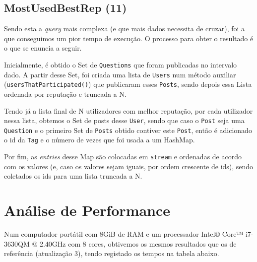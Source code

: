 \documentclass[a4paper]{article}
\begin{document}
	\subsection{MostUsedBestRep (11)}
		\tab Sendo esta a \textit{query} mais complexa (e que mais dados necessita de cruzar), foi
		a que conseguimos um pior tempo de execução. O processo para obter o resultado é o que se
		enuncia a seguir.
		\par Inicialmente, é obtido o Set de \texttt{Questions} que foram publicadas no intervalo dado.
		A partir desse Set, foi criada uma lista de \texttt{Users} num método auxiliar (\texttt{usersThatParticipated()})
		que publicaram esses \texttt{Posts}, sendo depois essa Lista ordenada por reputação e truncada a N.
		\par Tendo já a lista final de N utilizadores com melhor reputação, por cada utilizador nessa lista,
		obtemos o Set de posts desse \texttt{User}, sendo que caso o \texttt{Post} seja uma
		\texttt{Question} e o primeiro Set de \texttt{Posts} obtido contiver este \texttt{Post},
		então é adicionado o id da \texttt{Tag} e o número de vezes que foi usada a um
		HashMap.
		\par Por fim, as \textit{entries} desse Map são colocadas em \texttt{stream} e
		ordenadas de acordo com os valores (e, caso os valores sejam iguais, por ordem
		crescente de ids), sendo coletados os ids para uma lista truncada a N.

\section{Análise de Performance}\label{ch:otimizacao}
	\tab Num computador portátil com 8GiB de RAM e um processador Intel® Core™ i7-3630QM @ 2.40GHz com
	8 cores,
	obtivemos os mesmos resultados que os de referência (atualização 3), tendo registado
	os tempos na tabela abaixo.
\end{document}
